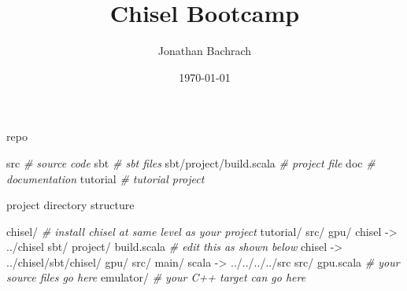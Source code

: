 \documentclass[xcolor=pdflatex,dvipsnames,table]{beamer}
\title{Chisel Bootcamp}
\author{Jonathan Bachrach}
\date{\today}
\newenvironment{FramedSemiVerb}%
{\begin{Sbox}\begin{minipage}{.94\textwidth}\begin{semiverbatim}}%
{\end{semiverbatim}\end{minipage}\end{Sbox}
\setlength{\fboxsep}{8pt}\fbox{\TheSbox}}
\newenvironment{FramedVerb}%
{\VerbatimEnvironment
\begin{Sbox}\begin{minipage}{.94\textwidth}\begin{Verbatim}}%
{\end{Verbatim}\end{minipage}\end{Sbox}
\setlength{\fboxsep}{8pt}\fbox{\TheSbox}}
\newcommand{\comment}[1]{{\color{Green}\it\smaller #1}}
\begin{document}
\begin{frame}
\titlepage
\end{frame}



\begin{frame}[fragile]{repo}
\begin{FramedSemiVerb}
src                     \comment{\# source code}
sbt                     \comment{\# sbt files}
sbt/project/build.scala \comment{\# project file}
doc                     \comment{\# documentation}
tutorial                \comment{\# tutorial project}
\end{FramedSemiVerb}
\end{frame}

\begin{frame}[fragile]{project directory structure}
\begin{footnotesize}
\begin{FramedSemiVerb}{0.95}
chisel/           \comment{\# install chisel at same level as your project}
  tutorial/
  src/
gpu/
  chisel -> ../chisel
  sbt/
    project/
      build.scala \comment{\# edit this as shown below}
    chisel -> ../chisel/sbt/chisel/
    gpu/
      src/
        main/
          scala -> ../../../../src
  src/ 
    gpu.scala     \comment{\# your source files go here}
  emulator/       \comment{\# your C++ target can go here}
\end{FramedSemiVerb}
\end{footnotesize}

\end{frame}
\end{document}
